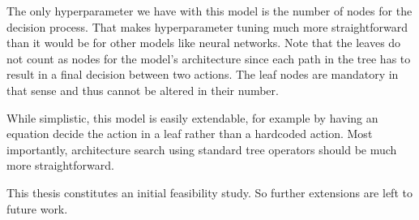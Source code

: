 The only hyperparameter we have with this model is the number of nodes for the decision process. That makes hyperparameter tuning much more straightforward than it would be for other models like neural networks. Note that the leaves do not count as nodes for the model's architecture since each path in the tree has to result in a final decision between two actions. The leaf nodes are mandatory in that sense and thus cannot be altered in their number.

While simplistic, this model is easily extendable, for example by having an equation decide the action in a leaf rather than a hardcoded action. Most importantly, architecture search using standard tree operators should be much more straightforward.

This thesis constitutes an initial feasibility study. So further extensions are left to future work.

